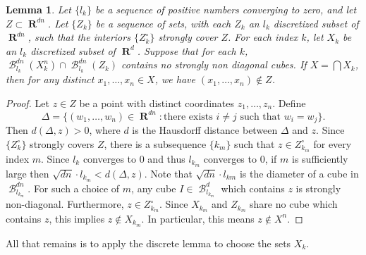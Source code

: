 \documentclass[dvipsnames,letterpaper,12pt]{article}
\numberwithin{equation}{section}
\theoremstyle{plain}
\newtheorem{lemma}{Lemma}
\theoremstyle{remark}
\DeclareMathOperator{\RR}{\mathbf{R}}
\DeclareMathOperator{\setcolon}{\colon}
\DeclareMathOperator{\B}{\mathcal{B}}
\begin{document}
\begin{lemma} \label{stronglydiagonal}
	Let $\{ l_k \}$ be a sequence of positive numbers converging to zero, and let $Z \subset \RR^{dn}$. Let $\{ Z_k \}$ be a sequence of sets, with each $Z_k$ an $l_k$ discretized subset of $\RR^{dn}$, such that the interiors $\{ Z_k^\circ \}$ strongly cover $Z$. For each index $k$, let $X_k$ be an $l_k$ discretized subset of $\RR^d$. Suppose that for each $k$, $\B^{dn}_{l_k}(X_k^n) \cap \B^{dn}_{l_k}(Z_k)$ contains no strongly non diagonal cubes. If $X = \bigcap X_k$, then for any distinct $x_1, \dots, x_n \in X$, we have $(x_1, \dots, x_n) \not \in Z$.
\end{lemma}
\begin{proof}
	Let $z \in Z$ be a point with distinct coordinates $z_1, \dots, z_n$. Define
	\[ \Delta = \{ (w_1, \dots, w_n) \in \RR^{dn} \setcolon \text{there exists $i \neq j$ such that $w_i = w_j$} \}. \]
	Then $d(\Delta,z) > 0$, where $d$ is the Hausdorff distance between $\Delta$ and $z$. Since $\{ Z_k^\circ \}$ strongly covers $Z$, there is a subsequence $\{ k_m \}$ such that $z \in Z_{k_m}^\circ$ for every index $m$. Since $l_k$ converges to 0 and thus $l_{k_m}$ converges to $0$, if $m$ is sufficiently large then $\sqrt{dn} \cdot l_{k_m} < d(\Delta,z)$. Note that $\sqrt{dn} \cdot l_{km}$ is the diameter of a cube in $\B_{l_{k_m}}^{dn}$. For such a choice of $m$, any cube $I \in \B^d_{l_{k_m}}$ which contains $z$ is strongly non-diagonal. Furthermore, $z \in Z_{k_m}^\circ$. Since $X_{k_m}$ and $Z_{k_m}$ share no cube which contains $z$, this implies $z \not \in X_{k_m}$. In particular, this means $z \not\in X^n$.
\end{proof}

All that remains is to apply the discrete lemma to choose the sets $X_k$.
\end{document}
